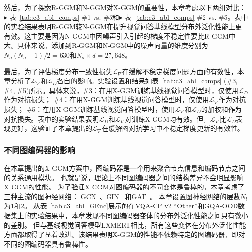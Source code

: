 然后，为了探索R-GGM和N-GGM对X-GGM的重要性，本章考虑以下两组对比：
$\blacktriangleright$ 表~\ref{tab:c3_abl_comps} \#1 vs. \#5和$\blacktriangleright$ 表~\ref{tab:c3_abl_comps} \#2 vs. \#5。表中的实验结果表明R-GGM较N-GGM在提升视觉问答基线模型分布外泛化性能上更有效。这主要是因为N-GGM中因噪声引入引起的梯度不稳定性要比R-GGM中大。具体来说，添加到R-GGM和N-GGM中的噪声向量的维度分别为$N_o (N_o - 1)/2 = 630$和$N_o \times d = 27,648$。

最后，为了评估梯度分布一致性损失$\mathcal{L}_{\nabla}$在缓解不稳定梯度问题方面的有效性，本章分析了$\mathcal{L}_{\nabla}$和$\mathcal{L}_D$各自的影响。实验设置和结果如表~\ref{tab:c3_abl_comps} (\#3, \#4, \#5)所示。具体来说，\#3：在用X-GGM训练基线视觉问答模型时，仅使用$\mathcal{L}_D$作为对抗损失； \#4：在用X-GGM训练基线视觉问答模型时，仅使用$\mathcal{L}_{\nabla}$作为对抗损失； \#5：在用X-GGM训练基线视觉问答模型时，使用$\mathcal{L}_{\nabla}$和$\mathcal{L}_D$的加权和作为对抗损失。表中的实验结果表明$\mathcal{L}_D$和$\mathcal{L}_{\nabla}$对训练X-GGM均有效。但，$\mathcal{L}_{\nabla}$比$\mathcal{L}_D$表现更好，这验证了本章提出的$\mathcal{L}_{\nabla}$在缓解图对抗学习中不稳定梯度更新的有效性。



\subsubsection{不同图编码器的影响}
在本章提出的X-GGM方案中，图编码器是一个用来聚合节点信息和编码节点之间的关系通用模块。
也就是说，理论上不同图编码器之间的结构差异不会明显影响X-GGM的性能。
为了验证X-GGM对图编码器的不同变体是鲁棒的，本章考虑了三种主流的图神经网络： GCN~\cite{kipf2016semi}、GIN~\cite{xu2018powerful} 和GAT~\cite{velivckovic2017graph}。
本章设置图神经网络的层数$N_l$为1和2。
从表~\ref{tab:c3_abl_GEnc}展示的在VQA-CP v2 ``Other''和GQA-OOD数据集上的实验结果中，本章发现不同图编码器变体的分布外泛化性能之间只有微小的差别。
但与基线视觉问答模型LXMERT相比，所有这些变体在分布外泛化性能方面都取得了显着改进。该结果表明X-GGM的性能不依赖特定的图编码器，即对不同的图编码器具有鲁棒性。



